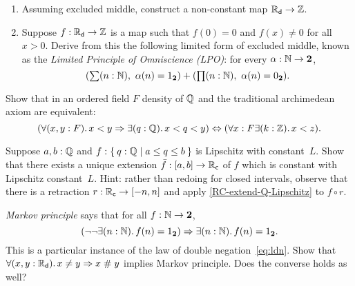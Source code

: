 \begin{ex} \label{ex:reals-non-constant-into-Z}
  \mbox{}
  \begin{enumerate}
  \item 
    Assuming excluded middle, construct a non-constant map $\mathbb{R}_\mathsf{d} \to \mathbb{Z}$.
  \item 
    Suppose $f : \mathbb{R}_\mathsf{d} \to \mathbb{Z}$ is a map such that $f(0) = 0$ and $f(x) \neq 0$ for all $x >
    0$. Derive from this the following limited form of excluded middle, known as the
    \emph{Limited Principle of Omniscience (LPO)}: for every $\alpha : \mathbb{N} \to \mathbf{2}$,
    \begin{equation*}
      (\sm{n : \N} \alpha(n) = \btrue) + (\prd{n : \N} \alpha(n) = \bfalse).
    \end{equation*}
  \end{enumerate}
\end{ex}

\begin{ex} \label{ex:traditional-archimedean}
  Show that in an ordered field $F$ density of $\mathbb{Q}$ and the traditional archimedean axiom
  are equivalent:
  \begin{equation*}
    (\fall{x, y : F} x < y \Rightarrow \exis{q : \Q} x < q < y)
    \Leftrightarrow
    (\forall{x : F} \exis{k : \Z} x < z).
  \end{equation*}  
\end{ex}

\begin{ex} \label{RC-Lipschitz-on-interval} Suppose $a, b : \mathbb{Q}$ and $f : \setof{ q : \Q |
    a \leq q \leq b }$ is Lipschitz with constant~$L$. Show that there exists a unique
  extension $\bar{f} : [a,b] \to \mathbb{R}_\mathsf{c}$ of $f$ which is constant with Lipschitz
  constant~$L$. Hint: rather than redoing  for closed
  intervals, observe that there is a retraction $r : \mathbb{R}_\mathsf{c} \to [-n,n]$ and apply
  \autoref{RC-extend-Q-Lipschitz} to $f \circ r$.
\end{ex}

\begin{ex} \label{ex:reals-apart-neq-MP}
  \emph{Markov principle} says that for all $f : \mathbb{N} \to \mathbf{2}$,
  \begin{equation*}
    (\lnot \lnot \exis{n : \nat} f(n) = \btrue)
    \Rightarrow
    \exis{n : \nat} f(n) = \btrue.
  \end{equation*}
  This is a particular instance of the law of double negation~\eqref{eq:ldn}. Show that
  $\fall{x, y: \RD} x \neq y \Rightarrow x \apart y$ implies Markov principle. Does the
  converse holds as well?
\end{ex}

